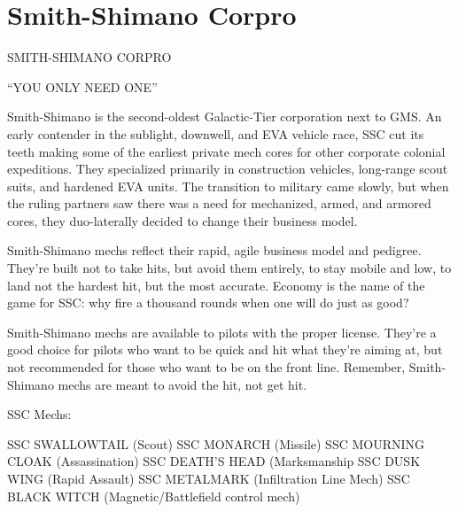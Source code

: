 \section{Smith-Shimano Corpro}

 SMITH-SHIMANO CORPRO   

                                        “YOU ONLY NEED ONE”  

Smith-Shimano is the second-oldest Galactic-Tier corporation next to GMS. An early  
contender in the sublight, downwell, and EVA vehicle race, SSC cut its teeth making some of the  
earliest private mech cores for other corporate colonial expeditions. They specialized primarily in  
construction vehicles, long-range scout suits, and hardened EVA units. The transition to military  
came slowly, but when the ruling partners saw there was a need for mechanized, armed, and  
armored cores, they duo-laterally decided to change their business model.
 

Smith-Shimano mechs reflect their rapid, agile business model and pedigree. They’re built not to  
take hits, but avoid them entirely, to stay mobile and low, to land not the hardest hit, but the most  
accurate. Economy is the name of the game for SSC: why fire a thousand rounds when one will  
do just as good?
 

Smith-Shimano mechs are available to pilots with the proper license. They’re a good choice for  
pilots who want to be quick and hit what they’re aiming at, but not recommended for those who  
want to be on the front line. Remember, Smith-Shimano mechs are meant to avoid the hit, not  
get hit.  
 

SSC Mechs:
 

SSC SWALLOWTAIL (Scout)  
SSC MONARCH (Missile)  
SSC MOURNING CLOAK (Assassination)  
SSC DEATH’S HEAD (Marksmanship  
SSC DUSK WING (Rapid Assault)  
SSC METALMARK (Infiltration Line Mech)  
SSC BLACK WITCH (Magnetic/Battlefield control mech)  

 
                                                                                                         
 
                                                                                                                         








